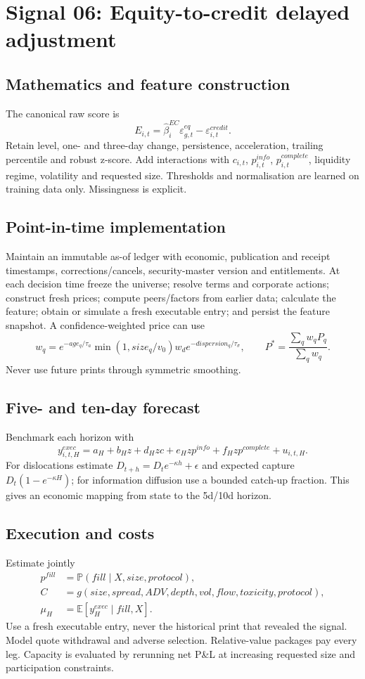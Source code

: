 \documentclass[10pt]{article}
\newcommand{\E}{\mathbb{E}}\newcommand{\Pp}{\mathbb{P}}
\begin{document}
\section{Signal 06: Equity-to-credit delayed adjustment}
\subsection{Mathematics and feature construction}
The canonical raw score is
\begin{equation}E_{i,t}=\widehat\beta^{EC}_i\varepsilon^{eq}_{g,t}-\varepsilon^{credit}_{i,t}.\end{equation}
Retain level, one- and three-day change, persistence, acceleration, trailing percentile and robust z-score. Add interactions with $c_{i,t}$, $p^{info}_{i,t}$, $p^{complete}_{i,t}$, liquidity regime, volatility and requested size. Thresholds and normalisation are learned on training data only. Missingness is explicit.

\subsection{Point-in-time implementation}
Maintain an immutable as-of ledger with economic, publication and receipt timestamps, corrections/cancels, security-master version and entitlements. At each decision time freeze the universe; resolve terms and corporate actions; construct fresh prices; compute peers/factors from earlier data; calculate the feature; obtain or simulate a fresh executable entry; and persist the feature snapshot. A confidence-weighted price can use
\[w_q=e^{-age_q/\tau_a}\min(1,size_q/v_0)w_d e^{-dispersion_q/\tau_\sigma},\qquad P^*=\frac{\sum_qw_qP_q}{\sum_qw_q}.\]
Never use future prints through symmetric smoothing.

\subsection{Five- and ten-day forecast}
Benchmark each horizon with
\[y^{exec}_{i,t,H}=a_H+b_Hz+d_Hzc+e_Hzp^{info}+f_Hzp^{complete}+u_{i,t,H}.\]
For dislocations estimate $D_{t+h}=D_te^{-\kappa h}+\epsilon$ and expected capture $D_t(1-e^{-\kappa H})$; for information diffusion use a bounded catch-up fraction. This gives an economic mapping from state to the 5d/10d horizon.

\subsection{Execution and costs}
Estimate jointly
\begin{align}
p^{fill}&=\Pp(fill\mid X,size,protocol),\\
C&=g(size,spread,ADV,depth,vol,flow,toxicity,protocol),\\
\mu_H&=\E[y^{exec}_H\mid fill,X].
\end{align}
Use a fresh executable entry, never the historical print that revealed the signal. Model quote withdrawal and adverse selection. Relative-value packages pay every leg. Capacity is evaluated by rerunning net P\&L at increasing requested size and participation constraints.
\end{document}
